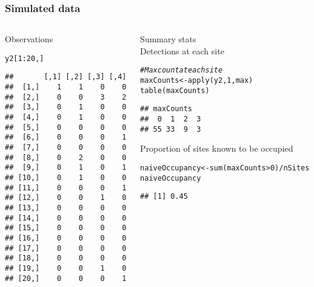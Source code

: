 \documentclass[color=usenames,dvipsnames]{beamer}\usepackage[]{graphicx}\usepackage[]{color}
\makeatletter
\newcommand{\hlnum}[1]{\textcolor[rgb]{0.69,0.494,0}{#1}}%
\newcommand{\hlcom}[1]{\textcolor[rgb]{0.514,0.506,0.514}{\textit{#1}}}%
\newcommand{\hlopt}[1]{\textcolor[rgb]{0,0,0}{#1}}%
\newcommand{\hlstd}[1]{\textcolor[rgb]{0,0,0}{#1}}%
\newcommand{\hlkwb}[1]{\textcolor[rgb]{0,0.341,0.682}{#1}}%
\newcommand{\hlkwd}[1]{\textcolor[rgb]{0.004,0.004,0.506}{#1}}%
\newenvironment{kframe}{%
 \def\at@end@of@kframe{}%
 \ifinner\ifhmode%
  \def\at@end@of@kframe{\end{minipage}}%
  \begin{minipage}{\columnwidth}%
 \fi\fi%
 \def\FrameCommand##1{\hskip\@totalleftmargin \hskip-\fboxsep
 \colorbox{shadecolor}{##1}\hskip-\fboxsep
     \hskip-\linewidth \hskip-\@totalleftmargin \hskip\columnwidth}%
 \MakeFramed {\advance\hsize-\width
   \@totalleftmargin\z@ \linewidth\hsize
   \@setminipage}}%
 {\par\unskip\endMakeFramed%
 \at@end@of@kframe}
\newenvironment{knitrout}{}{} %
\makeatother
\begin{document}
\begin{frame}[fragile]
  \frametitle{Simulated data}
  \begin{columns}
    \begin{column}{0.4\textwidth}
      \small
      Observations
\begin{knitrout}\scriptsize
{}\color{fgcolor}\begin{kframe}
\begin{alltt}
\hlstd{y2[}\hlnum{1}\hlopt{:}\hlnum{20}\hlstd{,]}
\end{alltt}
\begin{verbatim}
##       [,1] [,2] [,3] [,4]
##  [1,]    1    1    0    0
##  [2,]    0    0    3    2
##  [3,]    0    1    0    0
##  [4,]    0    1    0    0
##  [5,]    0    0    0    0
##  [6,]    0    0    0    1
##  [7,]    0    0    0    0
##  [8,]    0    2    0    0
##  [9,]    0    1    0    1
## [10,]    0    1    0    0
## [11,]    0    0    0    1
## [12,]    0    0    1    0
## [13,]    0    0    0    0
## [14,]    0    0    0    0
## [15,]    0    0    0    0
## [16,]    0    0    0    0
## [17,]    0    0    0    0
## [18,]    0    0    0    0
## [19,]    0    0    1    0
## [20,]    0    0    0    1
\end{verbatim}
\end{kframe}
\end{knitrout}
  \end{column}
  \begin{column}{0.6\textwidth}
    \pause
    {\centering Summary stats \\}
    \vspace{24pt}
  Detections at each site \\
\begin{knitrout}\scriptsize
{}\color{fgcolor}\begin{kframe}
\begin{alltt}
\hlcom{# Max count at each site}
\hlstd{maxCounts} \hlkwb{<-} \hlkwd{apply}\hlstd{(y2,} \hlnum{1}\hlstd{, max)}
\hlkwd{table}\hlstd{(maxCounts)}
\end{alltt}
\begin{verbatim}
## maxCounts
##  0  1  2  3 
## 55 33  9  3
\end{verbatim}
\end{kframe}
\end{knitrout}
\pause
\vfill
\small
Proportion of sites known to be occupied \\
\begin{knitrout}\scriptsize
{}\color{fgcolor}\begin{kframe}
\begin{alltt}
\hlstd{naiveOccupancy} \hlkwb{<-} \hlkwd{sum}\hlstd{(maxCounts}\hlopt{>}\hlnum{0}\hlstd{)}\hlopt{/}\hlstd{nSites}
\hlstd{naiveOccupancy}
\end{alltt}
\begin{verbatim}
## [1] 0.45
\end{verbatim}
\end{kframe}
\end{knitrout}


\end{column}
\end{columns}
\end{frame}
\end{document}
